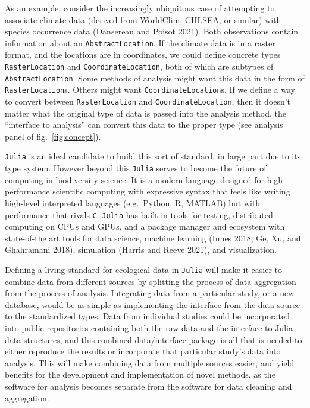 \documentclass[10pt,oneside]{article}
\begin{document}
As an example, consider the increasingly ubiquitous case of attempting
to associate climate data (derived from WorldClim, CHLSEA, or similar)
with species occurrence data (Dansereau and Poisot 2021). Both
observations contain information about an \texttt{AbstractLocation}. If
the climate data is in a raster format, and the locations are in
coordinates, we could define concrete types \texttt{RasterLocation} and
\texttt{CoordinateLocation}, both of which are subtypes of
\texttt{AbstractLocation}. Some methods of analysis might want this data
in the form of \texttt{RasterLocation}s. Others might want
\texttt{CoordinateLocation}s. If we define a way to convert between
\texttt{RasterLocation} and \texttt{CoordinateLocation}, then it doesn't
matter what the original type of data is passed into the analysis
method, the ``interface to analysis'' can convert this data to the
proper type (see analysis panel of fig.~\ref{fig:concept}).

\texttt{Julia} is an ideal candidate to build this sort of standard, in
large part due to its type system. However beyond this \texttt{Julia}
serves to become the future of computing in biodiversity science. It is
a modern language designed for high-performance scientific computing
with expressive syntax that feels like writing high-level interpreted
languages (e.g.~Python, R, MATLAB) but with performance that rivals
\texttt{C}. \texttt{Julia} has built-in tools for testing, distributed
computing on CPUs and GPUs, and a package manager and ecosystem with
state-of-the art tools for data science, machine learning (Innes 2018;
Ge, Xu, and Ghahramani 2018), simulation (Harris and Reeve 2021), and
visualization.

Defining a living standard for ecological data in \texttt{Julia} will
make it easier to combine data from different sources by splitting the
process of data aggregation from the process of analysis. Integrating
data from a particular study, or a new database, would be as simple as
implementing the interface from the data source to the standardized
types. Data from individual studies could be incorporated into public
repositories containing both the raw data and the interface to Julia
data structures, and this combined data/interface package is all that is
needed to either reproduce the results or incorporate that particular
study's data into analysis. This will make combining data from multiple
sources easier, and yield benefits for the development and
implementation of novel methods, as the software for analysis becomes
separate from the software for data cleaning and aggregation.
\end{document}
